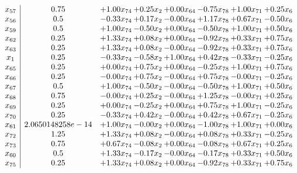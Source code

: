 \documentclass[8pt]{article}
\begin{document}
\[\begin{array}{c| c c@{\hskip 2pt} c@{\hskip 2pt} c@{\hskip 2pt} c@{\hskip 2pt} c@{\hskip 2pt} c@{\hskip 2pt} }
 x_{57}   &  0.75 & +  1.00 x_{74} & +  0.25 x_{2} & +  0.00 x_{64} & -0.75 x_{78} & +  1.00 x_{71} & +  0.25 x_{6}\\
 x_{56}   &  0.5 & -0.33 x_{74} & +  0.17 x_{2} & -0.00 x_{64} & +  1.17 x_{78} & +  0.67 x_{71} & -0.50 x_{6}\\
 x_{59}   &  0.5 & +  1.00 x_{74} & -0.50 x_{2} & +  0.00 x_{64} & -0.50 x_{78} & +  1.00 x_{71} & +  0.50 x_{6}\\
 x_{62}   &  0.25 & +  1.33 x_{74} & +  0.08 x_{2} & +  0.00 x_{64} & -0.92 x_{78} & +  0.33 x_{71} & +  0.75 x_{6}\\
 x_{63}   &  0.25 & +  1.33 x_{74} & +  0.08 x_{2} & -0.00 x_{64} & -0.92 x_{78} & +  0.33 x_{71} & +  0.75 x_{6}\\
 x_{1}   &  0.25 & -0.33 x_{74} & -0.58 x_{2} & +  1.00 x_{64} & +  0.42 x_{78} & -0.33 x_{71} & -0.25 x_{6}\\
 x_{65}   &  0.25 & +  0.00 x_{74} & +  0.75 x_{2} & +  0.00 x_{64} & -0.25 x_{78} & +  1.00 x_{71} & +  0.75 x_{6}\\
 x_{66}   &  0.25 & -0.00 x_{74} & +  0.75 x_{2} & -0.00 x_{64} & +  0.75 x_{78} & -0.00 x_{71} & -0.25 x_{6}\\
 x_{67}   &  0.5 & +  1.00 x_{74} & -0.50 x_{2} & -0.00 x_{64} & -0.50 x_{78} & +  1.00 x_{71} & +  0.50 x_{6}\\
 x_{68}   &  0.75 & -0.00 x_{74} & +  0.25 x_{2} & -0.00 x_{64} & +  1.25 x_{78} & -0.00 x_{71} & +  0.25 x_{6}\\
 x_{69}   &  0.25 & +  0.00 x_{74} & -0.25 x_{2} & +  0.00 x_{64} & +  0.75 x_{78} & +  1.00 x_{71} & -0.25 x_{6}\\
 x_{70}   &  0.25 & -0.33 x_{74} & +  0.42 x_{2} & -0.00 x_{64} & +  0.42 x_{78} & +  0.67 x_{71} & -0.25 x_{6}\\
 x_{61}   &  2.0650148258e-14 & +  1.00 x_{74} & -0.00 x_{2} & +  0.00 x_{64} & -1.00 x_{78} & +  1.00 x_{71} & +  0.00 x_{6}\\
 x_{72}   &  1.25 & +  1.33 x_{74} & +  0.08 x_{2} & -0.00 x_{64} & +  0.08 x_{78} & +  0.33 x_{71} & -0.25 x_{6}\\
 x_{73}   &  0.75 & +  0.67 x_{74} & -0.08 x_{2} & +  0.00 x_{64} & -0.08 x_{78} & +  0.67 x_{71} & +  0.25 x_{6}\\
 x_{60}   &  0.5 & +  1.33 x_{74} & -0.17 x_{2} & -0.00 x_{64} & -0.17 x_{78} & +  0.33 x_{71} & +  0.50 x_{6}\\
 x_{75}   &  0.25 & +  1.33 x_{74} & +  0.08 x_{2} & +  0.00 x_{64} & -0.92 x_{78} & +  0.33 x_{71} & +  0.75 x_{6}\\

\end{array}\]
\end{document}

